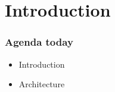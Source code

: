 


\maketitle

\section{Introduction}
\begin{frame}[fragile]
  \frametitle{Agenda today}
\begin{itemize}
	\item Introduction
	\item Architecture
\end{itemize}
	
\end{frame}

